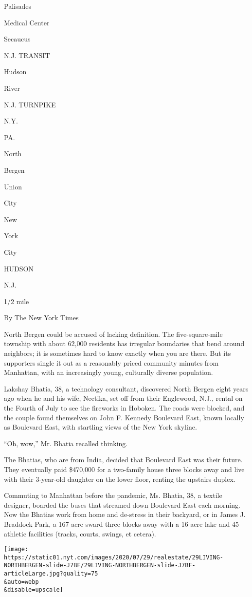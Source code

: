Palisades

Medical Center

Secaucus

N.J. TRANSIT

Hudson

River

N.J. TURNPIKE

N.Y.

PA.

North

Bergen

Union

City

New

York

City

HUDSON

N.J.

1/2 mile

By The New York Times

North Bergen could be accused of lacking definition. The
five-square-mile township with about 62,000 residents has irregular
boundaries that bend around neighbors; it is sometimes hard to know
exactly when you are there. But its supporters single it out as a
reasonably priced community minutes from Manhattan, with an increasingly
young, culturally diverse population.

Lakshay Bhatia, 38, a technology consultant, discovered North Bergen
eight years ago when he and his wife, Neetika, set off from their
Englewood, N.J., rental on the Fourth of July to see the fireworks in
Hoboken. The roads were blocked, and the couple found themselves on John
F. Kennedy Boulevard East, known locally as Boulevard East, with
startling views of the New York skyline.

``Oh, wow,'' Mr. Bhatia recalled thinking.

The Bhatias, who are from India, decided that Boulevard East was their
future. They eventually paid \$470,000 for a two-family house three
blocks away and live with their 3-year-old daughter on the lower floor,
renting the upstairs duplex.

Commuting to Manhattan before the pandemic, Ms. Bhatia, 38, a textile
designer, boarded the buses that streamed down Boulevard East each
morning. Now the Bhatias work from home and de-stress in their backyard,
or in James J. Braddock Park, a 167-acre sward three blocks away with a
16-acre lake and 45 athletic facilities (tracks, courts, swings, et
cetera).

\texttt{[image: https://static01.nyt.com/images/2020/07/29/realestate/29LIVING-NORTHBERGEN-slide-J7BF/29LIVING-NORTHBERGEN-slide-J7BF-articleLarge.jpg?quality=75\\\&auto=webp\\\&disable=upscale]}

